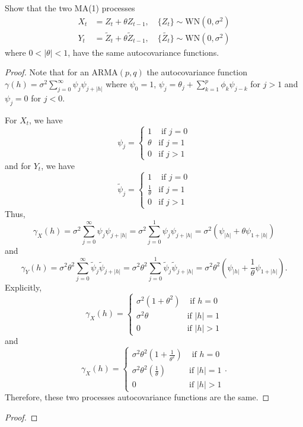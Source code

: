 \documentclass[12pt]{article}
\theoremstyle{definition}
\newenvironment{custompbm}[1]
  {\renewcommand\theproblem{#1}\problem}
  {\endproblem}
\begin{document}
\begin{custompbm}{3.6}
  Show that the two MA(1) processes
  \begin{align*}
    X_t &= Z_t + \theta Z_{t-1}, \quad \{Z_t\} \sim \text{WN}(0, \sigma ^ 2)\\
    Y_t &= \widetilde{Z}_t + \theta \widetilde{Z}_{t-1}, \quad \{\widetilde{Z_t}\} \sim \text{WN}(0, \sigma ^ 2)
  \end{align*}
  where $0 < |\theta| < 1$, have the same autocovariance functions.
\end{custompbm}

\begin{proof}
  Note that for an ARMA$(p,q)$ the autocovariance function $\gamma(h) = \sigma^2 \sum_{j=0}^\infty \psi_j \psi_{j+|h|}$
  where $\psi_0 = 1$, $\psi_j = \theta_j + \sum_{k=1}^p \phi_k \psi_{j-k}$ for $j >1$ and $\psi_j = 0$ for $j<0$.

  For $X_t$, we have
  \[
    \psi_j =
    \begin{cases}
      1 & \text{ if $j = 0$}\\
      \theta & \text{if $j = 1$}\\
      0 & \text{if $j > 1$}
    \end{cases}
  \]
  and for $Y_t$, we have
  \[
    \widetilde{\psi}_j =
    \begin{cases}
      1 & \text{ if $j = 0$}\\
      \frac{1}{\theta} & \text{if $j = 1$}\\
      0 & \text{if $j > 1$}
    \end{cases}
  \]
  Thus, $$\gamma_X(h) = \sigma^2 \sum_{j=0}^\infty \psi_{j} \psi_{j + |h|} = \sigma^2 \sum_{j=0}^1 \psi_{j} \psi_{j + |h|} = \sigma^2(\psi_{|h|} + \theta\psi_{1+|h|})$$
  and $$\gamma_Y(h) = \sigma^2\theta^2 \sum_{j=0}^\infty \widetilde{\psi}_{j} \widetilde{\psi}_{j + |h|} = \sigma^2\theta^2 \sum_{j=0}^1 \widetilde{\psi}_{j} \widetilde{\psi}_{j + |h|}= \sigma^2\theta^2\left(\psi_{|h|} + \frac{1}{\theta}\psi_{1+|h|}\right ).$$
  Explicitly,
  \[
    \gamma_X(h) =
    \begin{cases}
      \sigma^2(1+\theta^2) & \text{ if $h = 0$}\\
      \sigma^2 \theta & \text{if $|h| = 1$}\\
      0 & \text{if $|h| > 1$}
    \end{cases}
  \]
  and
  \[
    \gamma_X(h) =
    \begin{cases}
      \sigma^2\theta^2\left(1+\frac{1}{\theta^2}\right) & \text{ if $h = 0$}\\
      \sigma^2 \theta^2 \left(\frac{1}{\theta}\right) & \text{if $|h| = 1$}\\
      0 & \text{if $|h| > 1$}
    \end{cases}.
  \]
  Therefore, these two processes autocovariance functions are the same.
\end{proof}


\begin{custompbm}{3.10}
\end{custompbm}

\begin{proof}
\end{proof}
\end{document}
